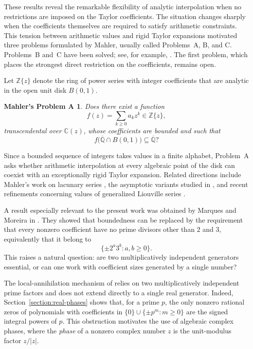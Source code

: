 \documentclass[10pt,a4paper]{amsart}
\newtheorem*{questionA}{Mahler's Problem A}
\numberwithin{equation}{section}
\newcommand{\Z}{\mathbb Z}
\newcommand{\C}{\mathbb C}
\newcommand{\Qbar}{\overline{\mathbb Q}}
\newcommand{\B}{B(0,1)}
\begin{document}
These results reveal the remarkable flexibility of analytic interpolation
when no restrictions are imposed on the Taylor coefficients. The situation
changes sharply when the coefficients themselves are required to satisfy
arithmetic constraints. This tension between arithmetic values and rigid
Taylor expansions motivated three problems formulated by Mahler, usually
called Problems~A, B, and C. Problems~B and~C have been solved; see, for
example, \cite{marquesmoreira2017,marquesmoreira2018}. The first problem,
which places the strongest direct restriction on the coefficients, remains
open.

Let $\Z\{z\}$ denote the ring of power series with integer coefficients that
are analytic in the open unit disk $\B$.

\begin{questionA}\label{question:mahlerA}
Does there exist a function
\[
        f(z)=\sum_{k\geq0}a_kz^k\in\Z\{z\},
\]
transcendental over $\C(z)$, whose coefficients are bounded and such that
\[
        f\bigl(\Qbar\cap\B\bigr)\subseteq\Qbar?
\]
\end{questionA}

Since a bounded sequence of integers takes values in a finite alphabet,
Problem~A asks whether arithmetic interpolation at every algebraic point of
the disk can coexist with an exceptionally rigid Taylor expansion. Related
directions include Mahler's work on lacunary series \cite{mahler1965}, the
asymptotic variants studied in \cite{franciscomarques2023, franciscomarques}, and recent
refinements concerning values of generalized Liouville series
\cite{bilumarquesmoreira2025}.

A result especially relevant to the present work was obtained by Marques and
Moreira in \cite{marquesmoreira2021}. They showed that boundedness can be
replaced by the requirement that every nonzero coefficient have no prime
divisors other than $2$ and $3$, equivalently that it belong to
\[
        \{\pm2^a3^b:a,b\geq0\}.
\]
This raises a natural question: are two multiplicatively independent
generators essential, or can one work with coefficient sizes generated by a
single number?

The local-annihilation mechanism of \cite{marquesmoreira2021} relies on two
multiplicatively independent prime factors and does not extend directly to a
single real generator. Indeed, Section~\ref{section:real-phases} shows that,
for a prime $p$, the only nonzero rational zeros of polynomials with
coefficients in $\{0\}\cup\{\pm p^m:m\geq0\}$ are the signed integral powers
of $p$. This obstruction motivates the use of algebraic complex phases,
where the \textit{phase} of a nonzero complex number $z$ is the unit-modulus factor
$z/|z|$.
\end{document}
